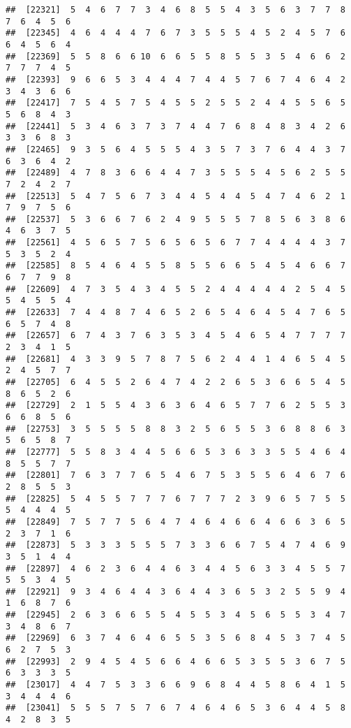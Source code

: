 \documentclass[
]{book}
\begin{document}
\begin{verbatim}
##  [22321]  5  4  6  7  7  3  4  6  8  5  5  4  3  5  6  3  7  7  8  7  6  4  5  6
##  [22345]  4  6  4  4  4  7  6  7  3  5  5  5  4  5  2  4  5  7  6  6  4  5  6  4
##  [22369]  5  5  8  6  6 10  6  6  5  5  8  5  5  3  5  4  6  6  2  7  7  7  4  5
##  [22393]  9  6  6  5  3  4  4  4  7  4  4  5  7  6  7  4  6  4  2  3  4  3  6  6
##  [22417]  7  5  4  5  7  5  4  5  5  2  5  5  2  4  4  5  5  6  5  5  6  8  4  3
##  [22441]  5  3  4  6  3  7  3  7  4  4  7  6  8  4  8  3  4  2  6  3  3  6  8  3
##  [22465]  9  3  5  6  4  5  5  5  4  3  5  7  3  7  6  4  4  3  7  6  3  6  4  2
##  [22489]  4  7  8  3  6  6  4  4  7  3  5  5  5  4  5  6  2  5  5  7  2  4  2  7
##  [22513]  5  4  7  5  6  7  3  4  4  5  4  4  5  4  7  4  6  2  1  7  9  7  5  6
##  [22537]  5  3  6  6  7  6  2  4  9  5  5  5  7  8  5  6  3  8  6  4  6  3  7  5
##  [22561]  4  5  6  5  7  5  6  5  6  5  6  7  7  4  4  4  4  3  7  5  3  5  2  4
##  [22585]  8  5  4  6  4  5  5  8  5  5  6  6  5  4  5  4  6  6  7  6  7  7  9  8
##  [22609]  4  7  3  5  4  3  4  5  5  2  4  4  4  4  4  2  5  4  5  5  4  5  5  4
##  [22633]  7  4  4  8  7  4  6  5  2  6  5  4  6  4  5  4  7  6  5  6  5  7  4  8
##  [22657]  6  7  4  3  7  6  3  5  3  4  5  4  6  5  4  7  7  7  7  2  3  4  1  5
##  [22681]  4  3  3  9  5  7  8  7  5  6  2  4  4  1  4  6  5  4  5  2  4  5  7  7
##  [22705]  6  4  5  5  2  6  4  7  4  2  2  6  5  3  6  6  5  4  5  8  6  5  2  6
##  [22729]  2  1  5  5  4  3  6  3  6  4  6  5  7  7  6  2  5  5  3  6  6  8  5  6
##  [22753]  3  5  5  5  5  8  8  3  2  5  6  5  5  3  6  8  8  6  3  5  6  5  8  7
##  [22777]  5  5  8  3  4  4  5  6  6  5  3  6  3  3  5  5  4  6  4  8  5  5  7  7
##  [22801]  7  6  3  7  7  6  5  4  6  7  5  3  5  5  6  4  6  7  6  2  8  5  5  3
##  [22825]  5  4  5  5  7  7  7  6  7  7  7  2  3  9  6  5  7  5  5  5  4  4  4  5
##  [22849]  7  5  7  7  5  6  4  7  4  6  4  6  6  4  6  6  3  6  5  2  3  7  1  6
##  [22873]  5  3  3  3  5  5  5  7  3  3  6  6  7  5  4  7  4  6  9  3  5  1  4  4
##  [22897]  4  6  2  3  6  4  4  6  3  4  4  5  6  3  3  4  5  5  7  5  5  3  4  5
##  [22921]  9  3  4  6  4  4  3  6  4  4  3  6  5  3  2  5  5  9  4  1  6  8  7  6
##  [22945]  2  6  3  6  6  5  5  4  5  5  3  4  5  6  5  5  3  4  7  3  4  8  6  7
##  [22969]  6  3  7  4  6  4  6  5  5  3  5  6  8  4  5  3  7  4  5  6  2  7  5  3
##  [22993]  2  9  4  5  4  5  6  6  4  6  6  5  3  5  5  3  6  7  5  6  3  3  3  5
##  [23017]  4  4  7  5  3  3  6  6  9  6  8  4  4  5  8  6  4  1  5  3  4  4  4  6
##  [23041]  5  5  5  7  5  7  6  7  4  6  4  6  5  3  6  4  4  5  8  4  2  8  3  5

\end{verbatim}
\end{document}
